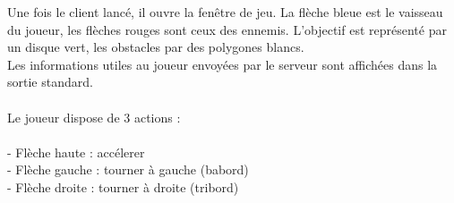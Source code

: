 \documentclass{article}
\begin{document}
Une fois le client lancé, il ouvre la fenêtre de jeu.
La flèche bleue est le vaisseau du joueur, les flèches rouges sont ceux des ennemis. L'objectif est représenté par un disque vert,
les obstacles par des polygones blancs.\\
Les informations utiles au joueur envoyées par le serveur sont affichées dans la sortie standard.\\
\\
Le joueur dispose de 3 actions :\\
\\
- Flèche haute : accélerer\\
- Flèche gauche : tourner à gauche (babord)\\
- Flèche droite : tourner à droite (tribord)\\
\end{document}
